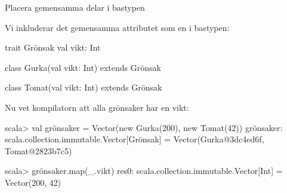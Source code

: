 \begin{Slide}{Placera gemensamma delar i bastypen}

Vi inkluderar det gemensamma attributet  som en  i bastypen:

\begin{Code}
trait Grönsak { val vikt: Int }

class Gurka(val vikt: Int) extends Grönsak

class Tomat(val vikt: Int) extends Grönsak
\end{Code}
Nu vet kompilatorn att alla grönsaker har en vikt: 
\begin{REPL}
scala> val grönsaker = Vector(new Gurka(200), new Tomat(42))
grönsaker: scala.collection.immutable.Vector[Grönsak] = 
  Vector(Gurka@3dc4ed6f, Tomat@2823b7c5)

scala> grönsaker.map(_.vikt)
res0: scala.collection.immutable.Vector[Int] = Vector(200, 42)
\end{REPL}

\end{Slide}





